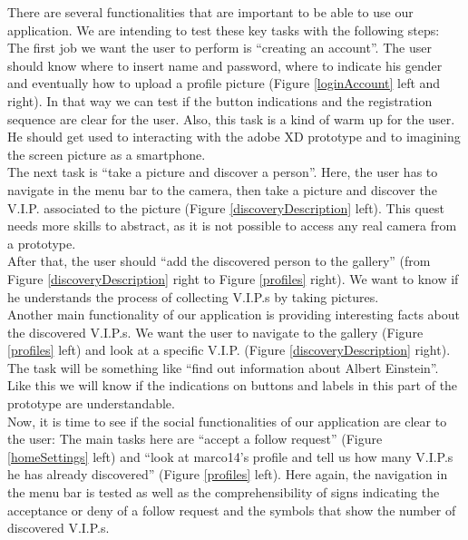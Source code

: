 \documentclass[12pt]{scrartcl}
\begin{document}
		There are several functionalities that are important to be able to use our application. We are intending to test these key tasks with the following steps:\\

		The first job we want the user to perform is “creating an account”. The user should know where to insert name and password, where to indicate his 	gender and eventually how to upload a profile picture (Figure \ref{loginAccount} left and right). In that way we can test if the button indications and the registration sequence are clear for the user. Also, this task is a kind of warm up for the user. He should get used to interacting with the adobe XD prototype and to imagining the screen picture as a smartphone.\\

		The next task is “take a picture and discover a person”. Here, the user has to navigate in the menu bar to the camera, then take a picture and discover the V.I.P. associated to the picture (Figure \ref{discoveryDescription} left). This quest needs more skills to abstract, as it is not possible to access any real camera from a prototype.\\

		After that, the user should “add the discovered person to the gallery” (from Figure \ref{discoveryDescription} right to Figure \ref{profiles} right). We want to know if he understands the process of collecting V.I.P.s by taking pictures.\\

 		Another main functionality of our application is providing interesting facts about the discovered V.I.P.s. We want the user to navigate to the gallery (Figure \ref{profiles} left) and look at a specific V.I.P. (Figure \ref{discoveryDescription} right). The task will be something like “find out information about Albert Einstein”. Like this we will know if the indications on buttons and labels in this part of the prototype are understandable.\\

		Now, it is time to see if the social functionalities of our application are clear to the user: The main tasks here are “accept a follow request” (Figure \ref{homeSettings} left) and “look at marco14’s profile and tell us how many V.I.P.s he has already discovered” (Figure \ref{profiles} left). Here again, the navigation in the menu bar is tested as well as the comprehensibility of signs indicating the acceptance or deny of a follow request and the symbols that show the number of discovered V.I.P.s.\\
\end{document}
